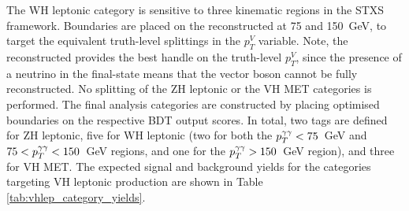The WH leptonic category is sensitive to three kinematic regions in the STXS framework. Boundaries are placed on the reconstructed \ptgg at 75 and 150~GeV, to target the equivalent truth-level splittings in the $p_T^V$ variable. Note, the reconstructed \ptgg provides the best handle on the truth-level $p_T^V$, since the presence of a neutrino in the final-state means that the vector boson cannot be fully reconstructed. No splitting of the ZH leptonic or the VH MET categories is performed. The final analysis categories are constructed by placing optimised boundaries on the respective BDT output scores. In total, two tags are defined for ZH leptonic, five for WH leptonic (two for both the $p_T^{\gamma\gamma}<75$~GeV and $75<p_T^{\gamma\gamma}<150$~GeV regions, and one for the $p_T^{\gamma\gamma}>150$~GeV region), and three for VH MET. The expected signal and background yields for the categories targeting VH leptonic production are shown in Table \ref{tab:vhlep_category_yields}.

